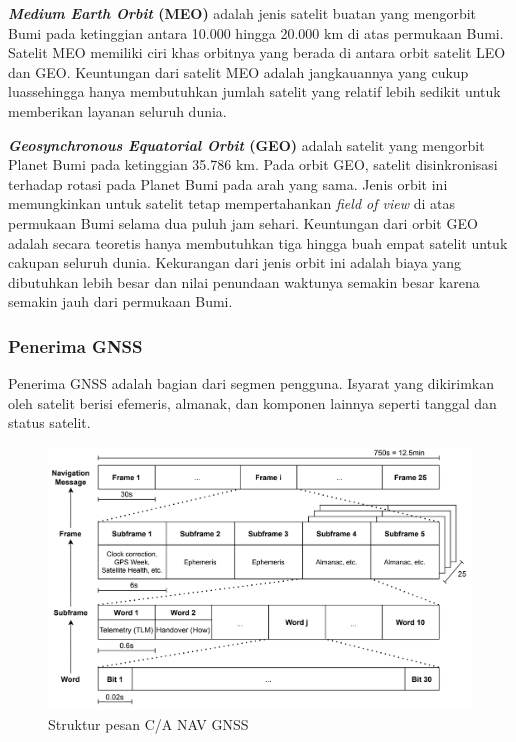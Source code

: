 \textbf{\textit{Medium Earth Orbit} (MEO)} adalah jenis satelit buatan yang mengorbit Bumi pada ketinggian antara 10.000 hingga 20.000 km di atas permukaan Bumi. Satelit MEO memiliki ciri khas orbitnya yang berada di antara orbit satelit LEO dan GEO. Keuntungan dari satelit MEO adalah jangkauannya yang cukup luassehingga hanya membutuhkan jumlah satelit yang relatif lebih sedikit untuk memberikan layanan seluruh dunia.

\textbf{\textit{Geosynchronous Equatorial Orbit} (GEO)} adalah satelit yang mengorbit Planet Bumi pada ketinggian 35.786 km. Pada orbit GEO, satelit disinkronisasi terhadap rotasi pada Planet Bumi pada arah yang sama. Jenis orbit ini memungkinkan untuk satelit tetap mempertahankan \textit{field of view} di atas permukaan Bumi selama dua puluh jam sehari. Keuntungan dari orbit GEO adalah secara teoretis hanya membutuhkan tiga hingga buah empat satelit untuk cakupan seluruh dunia. Kekurangan dari jenis orbit ini adalah biaya yang dibutuhkan lebih besar dan nilai penundaan waktunya semakin besar karena semakin jauh dari permukaan Bumi.

\subsubsection{Penerima GNSS}
Penerima GNSS adalah bagian dari segmen pengguna. Isyarat yang dikirimkan oleh satelit berisi efemeris, almanak, dan komponen lainnya seperti tanggal dan status satelit.

\begin{figure}[H]
	\centering
	\includegraphics[width=13cm]{contents/chapter-2/gnss_msg_structure.png}
	\caption{Struktur pesan C/A NAV GNSS}
	\label{Fig: gnss_message_structure}
\end{figure}


